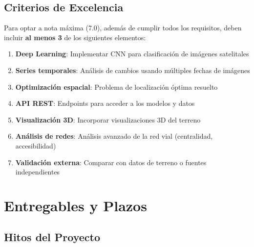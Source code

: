 \documentclass[12pt,a4paper]{article}
\begin{document}
\subsection{Criterios de Excelencia}

Para optar a nota máxima (7.0), además de cumplir todos los requisitos, deben incluir \textbf{al menos 3} de los siguientes elementos:

\begin{enumerate}
    \item \textbf{Deep Learning}: Implementar CNN para clasificación de imágenes satelitales
    \item \textbf{Series temporales}: Análisis de cambios usando múltiples fechas de imágenes
    \item \textbf{Optimización espacial}: Problema de localización óptima resuelto
    \item \textbf{API REST}: Endpoints para acceder a los modelos y datos
    \item \textbf{Visualización 3D}: Incorporar visualizaciones 3D del terreno
    \item \textbf{Análisis de redes}: Análisis avanzado de la red vial (centralidad, accesibilidad)
    \item \textbf{Validación externa}: Comparar con datos de terreno o fuentes independientes
\end{enumerate}

\section{Entregables y Plazos}

\subsection{Hitos del Proyecto}
\end{document}
